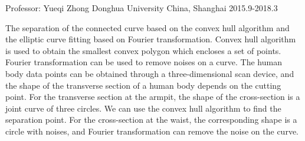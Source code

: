 \begin{cventries}
  \cventry
    {Professor: Yueqi Zhong} %
    {Donghua University} %
    {China, Shanghai} %
    {2015.9-2018.3} %
    {
      \begin{cvitems} %
	  \item{The separation of the connected curve based on the convex hull algorithm and the elliptic curve fitting based on Fourier transformation.  Convex hull algorithm is used to obtain the smallest convex polygon which encloses a set of points. Fourier transformation can be used to remove noises on a curve. The human body data points can be obtained through a three-dimensional scan device, and the shape of the transverse section of a human body depends on the cutting point. For the transverse section at the armpit, the shape of the cross-section is a joint curve of three circles. We can use the convex hull algorithm to find the separation point. For the cross-section at the waist, the corresponding shape is a circle with noises, and Fourier transformation can remove the noise on the
			  curve.
	  }
      \end{cvitems}
    }

\end{cventries}
